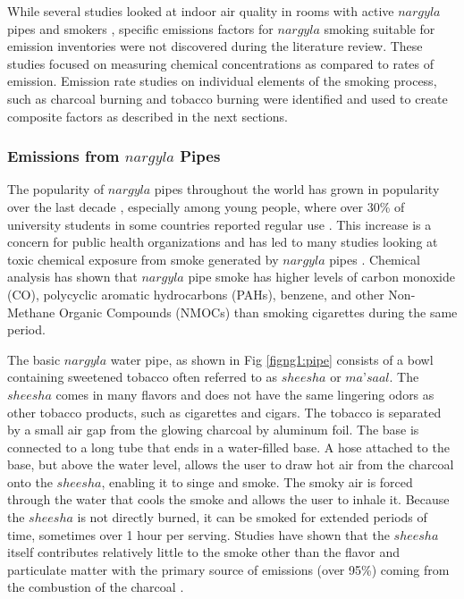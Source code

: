 While several studies looked at indoor air quality in rooms with active $nargyla$ pipes and smokers \citep{Fromme2009, Moon2015, Mulla2015}, specific emissions factors for $nargyla$ smoking suitable for emission inventories were not discovered during the literature review. These studies focused on measuring chemical concentrations as compared to rates of emission. Emission rate studies on individual elements of the smoking process, such as charcoal burning and tobacco burning were identified and used to create composite factors as described in the next sections. 

\subsubsection{Emissions from $nargyla$ Pipes}
The popularity of $nargyla$ pipes throughout the world has grown in popularity over the last decade \citep{Chaouachi2009, Monzer2008}, especially among young people, where over 30\% of university students in some countries reported regular use \citep{Eissenberg2009}. This increase is a concern for public health organizations and has led to many studies looking at toxic chemical exposure from smoke generated by $nargyla$ pipes \citep{Daher2010, Eissenberg2009, Monzer2008, Sepetdjian2010, Shihadeh2005}.  Chemical analysis has shown that $nargyla$ pipe smoke has higher levels of carbon monoxide (CO), polycyclic aromatic hydrocarbons (PAHs), benzene, and other Non-Methane Organic Compounds (NMOCs) than smoking cigarettes during the same period.

The basic $nargyla$ water pipe, as shown in Fig \ref{figng1:pipe} consists of a bowl containing sweetened tobacco often referred to as $sheesha$ or $ma’saal$.  The $sheesha$ comes in many flavors and does not have the same lingering odors as other tobacco products, such as cigarettes and cigars.  The tobacco is separated by a small air gap from the glowing charcoal by aluminum foil.  The base is connected to a long tube that ends in a water-filled base.  A hose attached to the base, but above the water level, allows the user to draw hot air from the charcoal onto the $sheesha$, enabling it to singe and smoke.  The smoky air is forced through the water that cools the smoke and allows the user to inhale it.  Because the $sheesha$ is not directly burned, it can be smoked for extended periods of time, sometimes over 1 hour per serving.  Studies have shown that the $sheesha$ itself contributes relatively little to the smoke other than the flavor and particulate matter with the primary source of emissions (over 95\%) coming from the combustion of the charcoal \citep{Sepetdjian2010}.

